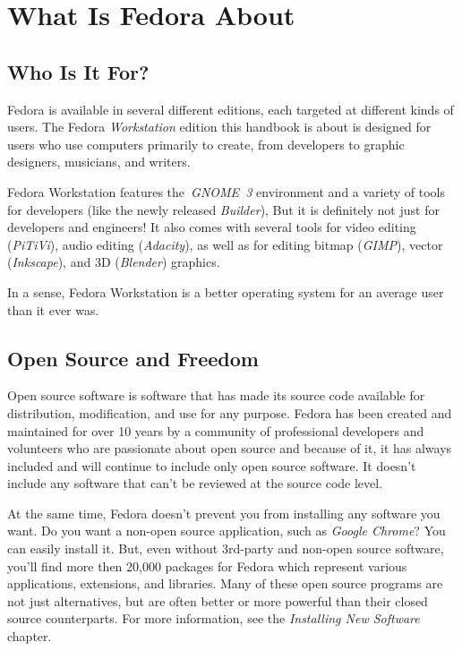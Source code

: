 \chapter*{What Is Fedora About}
\section*{Who Is It For?}

Fedora is available in several different editions, each targeted at different kinds of users. The Fedora \emph{Workstation} edition this handbook is about is designed for users who use computers primarily to create, from developers to graphic designers, musicians, and writers.

Fedora Workstation features the~\emph{GNOME~3} environment and a variety of tools for developers (like the newly released \emph{Builder}),  But it is definitely not just for developers and engineers! It also comes with several tools for video editing (\emph{PiTiVi}), audio editing (\emph{Adacity}), as well as for editing bitmap (\emph{GIMP}), vector (\emph{Inkscape}), and 3D (\emph{Blender}) graphics.

In a sense, Fedora Workstation is a better operating system for an average user than it ever was.

\section*{Open Source and Freedom}

Open source software is software that has made its source code available for distribution, modification, and use for any purpose. Fedora has been created and maintained for over 10 years by a community of professional developers and volunteers who are passionate about open source and because of it, it has always included and will continue to include only open source software. It doesn't include any software that can't be reviewed at the source code level.

At the same time, Fedora doesn't prevent you from installing any software you want. Do you want a non-open source application, such as \emph{Google Chrome}? You can easily install it. But, even without 3rd-party and non-open source software, you'll find more then 20,000 packages for Fedora which represent various applications, extensions, and libraries. Many of these open source programs are not just alternatives, but are often better or more powerful than their closed source counterparts. For more information, see the \emph{Installing New Software} chapter.

